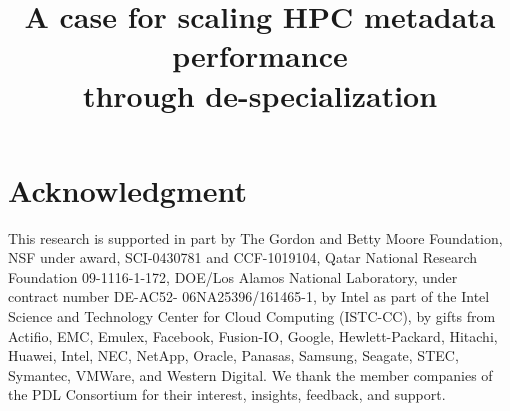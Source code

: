 \documentclass[10pt, conference]{IEEEtran}
\begin{document}
\date{}

\title{A case for scaling HPC metadata performance \\ through
de-specialization}

\author{
}

\maketitle

\IEEEpeerreviewmaketitle

%





\section*{Acknowledgment}
This research is supported in part by The Gordon and Betty Moore Foundation, NSF under award, SCI-0430781 and
CCF-1019104, Qatar National Research Foundation 09-1116-1-172, DOE/Los Alamos National Laboratory, under contract number DE-AC52-
06NA25396/161465-1, by Intel as part of the Intel Science and Technology Center for Cloud Computing (ISTC-CC), by gifts from
Actifio, EMC, Emulex, Facebook, Fusion-IO, Google, Hewlett-Packard, Hitachi, Huawei, Intel, 
NEC, NetApp, Oracle, Panasas, Samsung, Seagate, STEC, Symantec, VMWare, and Western Digital.
We thank the member companies of the PDL Consortium for their interest, insights, feedback, and support.



\end{document}

